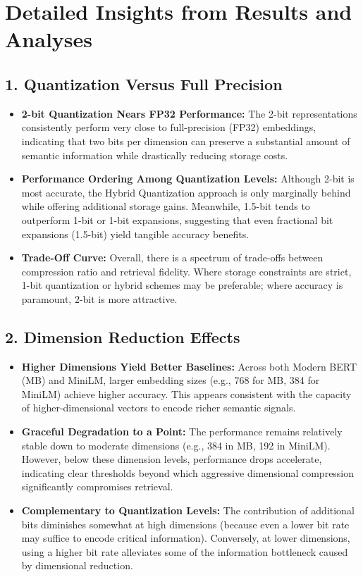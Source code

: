 \documentclass{article}
\begin{document}
\section*{Detailed Insights from Results and Analyses}

\subsection*{1. Quantization Versus Full Precision}
\begin{itemize}
    \item \textbf{2-bit Quantization Nears FP32 Performance:} The 2-bit representations consistently perform very close to full-precision (FP32) embeddings, indicating that two bits per dimension can preserve a substantial amount of semantic information while drastically reducing storage costs.
    \item \textbf{Performance Ordering Among Quantization Levels:} Although 2-bit is most accurate, the Hybrid Quantization approach is only marginally behind while offering additional storage gains. Meanwhile, 1.5-bit tends to outperform 1-bit or 1-bit expansions, suggesting that even fractional bit expansions (1.5-bit) yield tangible accuracy benefits.
    \item \textbf{Trade-Off Curve:} Overall, there is a spectrum of trade-offs between compression ratio and retrieval fidelity. Where storage constraints are strict, 1-bit quantization or hybrid schemes may be preferable; where accuracy is paramount, 2-bit is more attractive.
\end{itemize}

\subsection*{2. Dimension Reduction Effects}
\begin{itemize}
    \item \textbf{Higher Dimensions Yield Better Baselines:} Across both Modern BERT (MB) and MiniLM, larger embedding sizes (e.g., 768 for MB, 384 for MiniLM) achieve higher accuracy. This appears consistent with the capacity of higher-dimensional vectors to encode richer semantic signals.
    \item \textbf{Graceful Degradation to a Point:} The performance remains relatively stable down to moderate dimensions (e.g., 384 in MB, 192 in MiniLM). However, below these dimension levels, performance drops accelerate, indicating clear thresholds beyond which aggressive dimensional compression significantly compromises retrieval.
    \item \textbf{Complementary to Quantization Levels:} The contribution of additional bits diminishes somewhat at high dimensions (because even a lower bit rate may suffice to encode critical information). Conversely, at lower dimensions, using a higher bit rate alleviates some of the information bottleneck caused by dimensional reduction.
\end{itemize}
\end{document}
